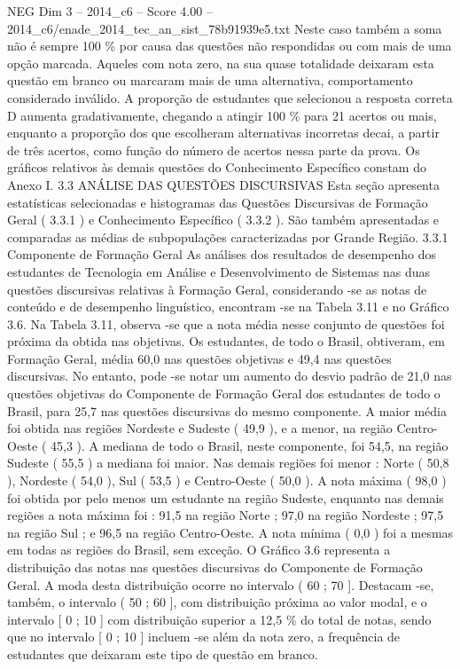 \begin{textsample}{NEG Dim 3 – 2014\_c6 – Score 4.00 – 2014\_c6/enade\_2014\_tec\_an\_sist\_78b91939e5.txt}
Neste caso também a soma não é sempre 100 \% por causa das questões não respondidas ou com mais de uma opção marcada.
Aqueles com nota zero, na sua quase totalidade deixaram esta questão em branco ou marcaram mais de uma alternativa, comportamento considerado inválido.
A proporção de estudantes que selecionou a resposta correta D aumenta gradativamente, chegando a atingir 100 \% para 21 acertos ou mais, enquanto a proporção dos que escolheram alternativas incorretas decai, a partir de três acertos, como função do número de acertos nessa parte da prova.
Os gráficos relativos às demais questões do Conhecimento Específico constam do Anexo I. 3.3 ANÁLISE DAS QUESTÕES DISCURSIVAS Esta seção apresenta estatísticas selecionadas e histogramas das Questões Discursivas de Formação Geral ( 3.3.1 ) e Conhecimento Específico ( 3.3.2 ).
São também apresentadas e comparadas as médias de subpopulações caracterizadas por Grande Região. 3.3.1 Componente de Formação Geral As análises dos resultados de desempenho dos estudantes de Tecnologia em Análise e Desenvolvimento de Sistemas nas duas questões discursivas relativas à Formação Geral, considerando -se as notas de conteúdo e de desempenho linguístico, encontram -se na Tabela 3.11 e no Gráfico 3.6.
Na Tabela 3.11, observa -se que a nota média nesse conjunto de questões foi próxima da obtida nas objetivas.
Os estudantes, de todo o Brasil, obtiveram, em Formação Geral, média 60,0 nas questões objetivas e 49,4 nas questões discursivas.
No entanto, pode -se notar um aumento do desvio padrão de 21,0 nas questões objetivas do Componente de Formação Geral dos estudantes de todo o Brasil, para 25,7 nas questões discursivas do mesmo componente.
A maior média foi obtida nas regiões Nordeste e Sudeste ( 49,9 ), e a menor, na região Centro-Oeste ( 45,3 ).
A mediana de todo o Brasil, neste componente, foi 54,5, na região Sudeste ( 55,5 ) a mediana foi maior.
Nas demais regiões foi menor : Norte ( 50,8 ), Nordeste ( 54,0 ), Sul ( 53,5 ) e Centro-Oeste ( 50,0 ).
A nota máxima ( 98,0 ) foi obtida por pelo menos um estudante na região Sudeste, enquanto nas demais regiões a nota máxima foi : 91,5 na região Norte ; 97,0 na região Nordeste ; 97,5 na região Sul ; e 96,5 na região Centro-Oeste.
A nota mínima ( 0,0 ) foi a mesmas em todas as regiões do Brasil, sem exceção.
O Gráfico 3.6 representa a distribuição das notas nas questões discursivas do Componente de Formação Geral.
A moda desta distribuição ocorre no intervalo ( 60 ; 70 ].
Destacam -se, também, o intervalo ( 50 ; 60 ], com distribuição próxima ao valor modal, e o intervalo [ 0 ; 10 ] com distribuição superior a 12,5 \% do total de notas, sendo que no intervalo [ 0 ; 10 ] incluem -se além da nota zero, a frequência de estudantes que deixaram este tipo de questão em branco.

\end{textsample}
